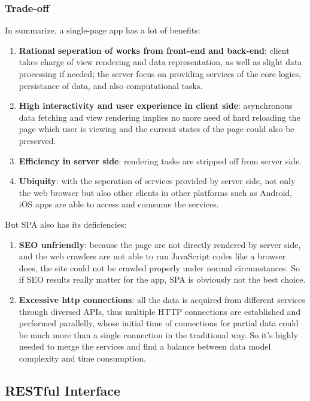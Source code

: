\subsubsection{Trade-off}
In summarize, a single-page app has a lot of benefits:
\begin{enumerate}
\item
\textbf{Rational seperation of works from front-end and back-end}: client takes charge of view rendering and data representation, as well as slight data processing if needed; the server focus on providing services of the core logics, persistance of data, and also computational tasks.
\item
\textbf{High interactivity and user experience in client side}: asynchronous data fetching and view rendering implies no more need of hard reloading the page which user is viewing and the current states of the page could also be preserved.
\item
\textbf{Efficiency in server side}: rendering tasks are stripped off from server side.
\item
\textbf{Ubiquity}: with the seperation of services provided by server side, not only the web browser but also other clients in other platforms such as Android, iOS apps are able to access and comsume the services.
\end{enumerate}

But SPA also has its deficiencies:

\begin{enumerate}
\item
\textbf{\gls{SEO} unfriendly}: because the page are not directly rendered by server side, and the web crawlers are not able to run JavaScript codes like a browser does, the site could not be crawled properly under normal circumstances. So if SEO results really matter for the app, SPA is obviously not the best choice.
\item
\textbf{Excessive http connections}: all the data is acquired from different services through diversed \gls{API}s, thus multiple HTTP connections are established and performed parallelly, whose initial time of connections for partial data could be much more than a single connection in the traditional way. So it's highly needed to merge the services and find a balance between data model complexity and time consumption.
\end{enumerate}


\subsection{RESTful Interface}

